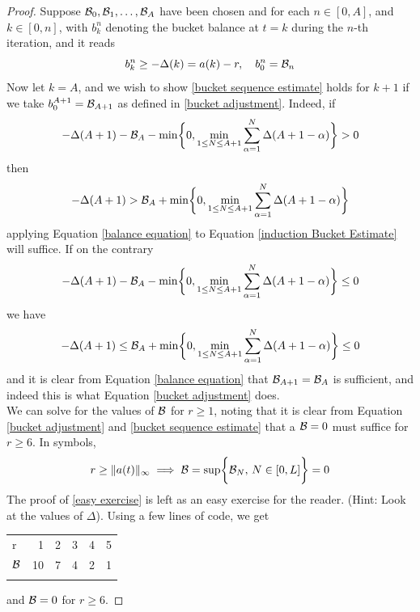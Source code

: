 \documentclass[../../main.tex]{subfiles}
\begin{document}
\begin{proof}
    Suppose $\mathcal{B}_0,\mathcal{B}_1,\ldots,\mathcal{B}_A$ have been chosen and for each $n\in[0,A]$, and $k\in[0,n]$, with $b_k^n$ denoting the bucket balance at $t=k$ during the $n$-th iteration, and it reads
    \begin{equation}\label{bucket sequence estimate}
        b_k^n\geq -\Delta(k)=a(k)-r,\quad b_0^n = \mathcal{B}_n
    \end{equation}
    Now let $k=A$, and we wish to show \eqref{bucket sequence estimate} holds for $k+1$ if we take $b^{A+1}_0=\mathcal{B}_{A+1}$ as defined in \eqref{bucket adjustment}. Indeed, if 
    \[-\Delta(A+1)-\mathcal{B}_{A}-\min\biggl\{0,\min_{1\leq N\leq A+1}\sum^N_{\alpha=1}\Delta(A+1-\alpha)\biggr\}>0\]
    then
    \begin{equation}\label{induction Bucket Estimate}-\Delta(A+1)>\mathcal{B}_{A}+\min\biggl\{0,\min_{1\leq N\leq A+1}\sum^N_{\alpha=1}\Delta(A+1-\alpha)\biggr\}\end{equation}
    applying Equation \eqref{balance equation} to Equation \eqref{induction Bucket Estimate} will suffice. If on the contrary \[-\Delta(A+1)-\mathcal{B}_{A}-\min\biggl\{0,\min_{1\leq N\leq A+1}\sum^N_{\alpha=1}\Delta(A+1-\alpha)\biggr\}\leq 0\]
    we have
    \[-\Delta(A+1)\leq \mathcal{B}_{A}+\min\biggl\{0,\min_{1\leq N\leq A+1}\sum^N_{\alpha=1}\Delta(A+1-\alpha)\biggr\}\leq 0\]
    and it is clear from Equation \eqref{balance equation} that $\mathcal{B}_{A+1}=\mathcal{B}_{A}$ is sufficient, and indeed this is what Equation \eqref{bucket adjustment} does.\\
    
    We can solve for the values of $\mathcal{B}$ for $r\geq 1$, noting that it is clear from Equation \eqref{bucket adjustment} and \eqref{bucket sequence estimate} that a $\mathcal{B}=0$ must suffice for $r\geq 6$. In symbols,
    \begin{equation}\label{easy exercise}r\geq \lVert {a(t)} \rVert_\infty\implies \mathcal{B}=\sup\biggl\{\mathcal{B}_N,\,N\in[0,L]\biggr\}=0\end{equation}
    The proof of \eqref{easy exercise} is left as an easy exercise for the reader. (Hint: Look at the values of $\Delta$). Using a few lines of code, we get
    \begin{center}
    \begin{tabularx}{\textwidth}{l r r r r r}
    \cmidrule[0.75pt](r){1-6}\addlinespace[0.2em]
    
    r&1&2&3&4&5\tabularnewline
    $\mathcal{B}$&10&7&4&2&1\tabularnewline
    
    \cmidrule[0.75pt](r){1-6}\addlinespace[0.2em]
    \end{tabularx}\label{BucketSizes}
\end{center}
and $\mathcal{B}=0$ for $r\geq 6$.
\end{proof}
\end{document}

